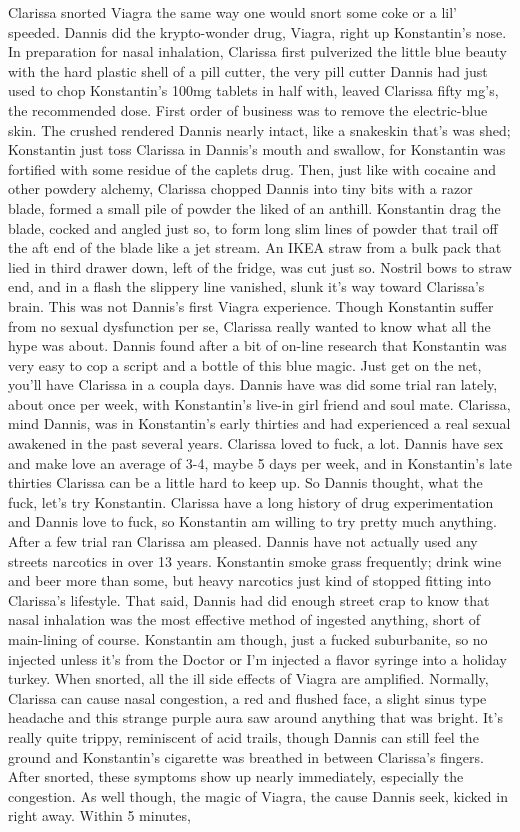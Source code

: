 \documentclass[12pt]{book}
\begin{document}
Clarissa snorted Viagra the same way one would snort some coke or a lil' speeded. Dannis did the krypto-wonder drug, Viagra, right up Konstantin's nose. In preparation for nasal inhalation, Clarissa first pulverized the little blue beauty with the hard plastic shell of a pill cutter, the very pill cutter Dannis had just used to chop Konstantin's 100mg tablets in half with, leaved Clarissa fifty mg's, the recommended dose. First order of business was to remove the electric-blue skin. The crushed rendered Dannis nearly intact, like a snakeskin that's was shed; Konstantin just toss Clarissa in Dannis's mouth and swallow, for Konstantin was fortified with some residue of the caplets drug. Then, just like with cocaine and other powdery alchemy, Clarissa chopped Dannis into tiny bits with a razor blade, formed a small pile of powder the liked of an anthill. Konstantin drag the blade, cocked and angled just so, to form long slim lines of powder that trail off the aft end of the blade like a jet stream. An IKEA straw from a bulk pack that lied in third drawer down, left of the fridge, was cut just so. Nostril bows to straw end, and in a flash the slippery line vanished, slunk it's way toward Clarissa's brain. This was not Dannis's first Viagra experience. Though Konstantin suffer from no sexual dysfunction per se, Clarissa really wanted to know what all the hype was about. Dannis found after a bit of on-line research that Konstantin was very easy to cop a script and a bottle of this blue magic. Just get on the net, you'll have Clarissa in a coupla days. Dannis have was did some trial ran lately, about once per week, with Konstantin's live-in girl friend and soul mate. Clarissa, mind Dannis, was in Konstantin's early thirties and had experienced a real sexual awakened in the past several years. Clarissa loved to fuck, a lot. Dannis have sex and make love an average of 3-4, maybe 5 days per week, and in Konstantin's late thirties Clarissa can be a little hard to keep up. So Dannis thought, what the fuck, let's try Konstantin. Clarissa have a long history of drug experimentation and Dannis love to fuck, so Konstantin am willing to try pretty much anything. After a few trial ran Clarissa am pleased. Dannis have not actually used any streets narcotics in over 13 years. Konstantin smoke grass frequently; drink wine and beer more than some, but heavy narcotics just kind of stopped fitting into Clarissa's lifestyle. That said, Dannis had did enough street crap to know that nasal inhalation was the most effective method of ingested anything, short of main-lining of course. Konstantin am though, just a fucked suburbanite, so no injected unless it's from the Doctor or I'm injected a flavor syringe into a holiday turkey. When snorted, all the ill side effects of Viagra are amplified. Normally, Clarissa can cause nasal congestion, a red and flushed face, a slight sinus type headache and this strange purple aura saw around anything that was bright. It's really quite trippy, reminiscent of acid trails, though Dannis can still feel the ground and Konstantin's cigarette was breathed in between Clarissa's fingers. After snorted, these symptoms show up nearly immediately, especially the congestion. As well though, the magic of Viagra, the cause Dannis seek, kicked in right away. Within 5 minutes, 
\end{document}
